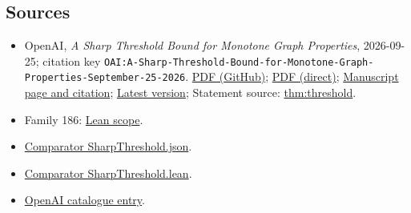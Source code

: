 \documentclass[11pt]{article}
\begin{document}
\subsection{Sources}
\begin{itemize}
\item OpenAI, \emph{A Sharp Threshold Bound for Monotone Graph Properties}, 2026-09-25; citation key \texttt{OAI:A-Sharp-Threshold-Bound-for-Monotone-Graph-Properties-September-25-2026}. \href{https://github.com/openai/math/blob/adc7f1241b42e322a6451854ab7e4b4c146bf78a/preprints/A-Sharp-Threshold-Bound-for-Monotone-Graph-Properties-September-25-2026/paper.pdf}{PDF (GitHub)}; \href{https://github.com/openai/math/raw/adc7f1241b42e322a6451854ab7e4b4c146bf78a/preprints/A-Sharp-Threshold-Bound-for-Monotone-Graph-Properties-September-25-2026/paper.pdf}{PDF (direct)}; \href{https://github.com/openai/math/blob/adc7f1241b42e322a6451854ab7e4b4c146bf78a/preprints/A-Sharp-Threshold-Bound-for-Monotone-Graph-Properties-September-25-2026/README.md}{Manuscript page and citation}; \href{https://github.com/openai/math/blob/main/preprints/A-Sharp-Threshold-Bound-for-Monotone-Graph-Properties-September-25-2026/paper.pdf}{Latest version}; Statement source: \href{https://github.com/openai/math/blob/adc7f1241b42e322a6451854ab7e4b4c146bf78a/preprints/A-Sharp-Threshold-Bound-for-Monotone-Graph-Properties-September-25-2026/build/sections/introduction.tex\#L12}{thm:threshold}.
\item Family 186: \href{https://github.com/openai/math/blob/adc7f1241b42e322a6451854ab7e4b4c146bf78a/lean/docs/186.md}{Lean scope}.
\item \href{https://github.com/openai/math/blob/adc7f1241b42e322a6451854ab7e4b4c146bf78a/lean/ComparatorChallenges/SharpThreshold.json}{Comparator SharpThreshold.json}.
\item \href{https://github.com/openai/math/blob/adc7f1241b42e322a6451854ab7e4b4c146bf78a/lean/ComparatorChallenges/SharpThreshold.lean}{Comparator SharpThreshold.lean}.
\item \href{https://github.com/openai/math/blob/adc7f1241b42e322a6451854ab7e4b4c146bf78a/CONTENTS.md}{OpenAI catalogue entry}.
\end{itemize}
\end{document}
